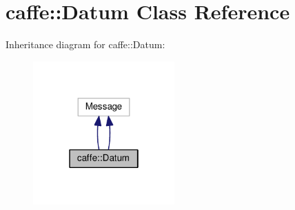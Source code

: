 \hypertarget{classcaffe_1_1_datum}{}\section{caffe\+:\+:Datum Class Reference}
\label{classcaffe_1_1_datum}


Inheritance diagram for caffe\+:\+:Datum\+:
\nopagebreak
\begin{figure}[H]
\begin{center}
\leavevmode
\includegraphics[width=154pt]{classcaffe_1_1_datum__inherit__graph}
\end{center}
\end{figure}
